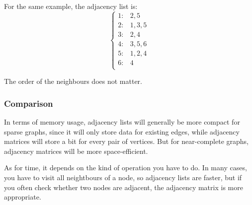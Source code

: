 For the same example, the adjacency list is:
\[
	\left\{
		\begin{array}{rl}
			1:&2,5\\
			2:&1,3,5\\
			3:&2,4\\
			4:&3,5,6\\
			5:&1,2,4\\
			6:&4\\
		\end{array}
	\right.
\]

The order of the neighbours does not matter.

\subsubsection{Comparison}

In terms of memory usage,
adjacency lists will generally be more compact for sparse graphs,
since it will only store data for existing edges,
while adjacency matrices will store a bit for every pair of vertices.
But for near-complete graphs, adjacency matrices will be more space-efficient.

As for time, it depends on the kind of operation you have to do.
In many cases, you have to visit all neightbours of a node,
so adjacency lists are faster,
but if you often check whether two nodes are adjacent,
the adjacency matrix is more appropriate.
